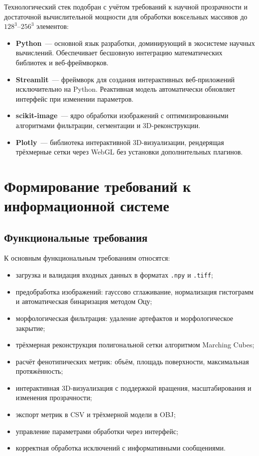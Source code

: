 \documentclass[14pt,a4paper]{extreport}
\begin{document}
Технологический стек подобран с учётом требований к научной прозрачности и достаточной вычислительной мощности для обработки воксельных массивов до $128^3$--$256^3$ элементов:
\begin{itemize}
  \item \textbf{Python}~--- основной язык разработки, доминирующий в экосистеме научных вычислений. Обеспечивает бесшовную интеграцию математических библиотек и веб-фреймворков.
  \item \textbf{Streamlit}~--- фреймворк для создания интерактивных веб-приложений исключительно на Python. Реактивная модель автоматически обновляет интерфейс при изменении параметров.
  \item \textbf{scikit-image}~--- ядро обработки изображений с оптимизированными алгоритмами фильтрации, сегментации и 3D-реконструкции.
  \item \textbf{Plotly}~--- библиотека интерактивной 3D-визуализации, рендерящая трёхмерные сетки через WebGL без установки дополнительных плагинов.
\end{itemize}

\section{Формирование требований к информационной системе}

\subsection{Функциональные требования}

К основным функциональным требованиям относятся:
\begin{itemize}
  \item загрузка и валидация входных данных в форматах \texttt{.npy} и \texttt{.tiff};
  \item предобработка изображений: гауссово сглаживание, нормализация гистограмм и автоматическая бинаризация методом Оцу;
  \item морфологическая фильтрация: удаление артефактов и морфологическое закрытие;
  \item трёхмерная реконструкция полигональной сетки алгоритмом Marching Cubes;
  \item расчёт фенотипических метрик: объём, площадь поверхности, максимальная протяжённость;
  \item интерактивная 3D-визуализация с поддержкой вращения, масштабирования и изменения прозрачности;
  \item экспорт метрик в CSV и трёхмерной модели в OBJ;
  \item управление параметрами обработки через интерфейс;
  \item корректная обработка исключений с информативными сообщениями.
\end{itemize}
\end{document}

